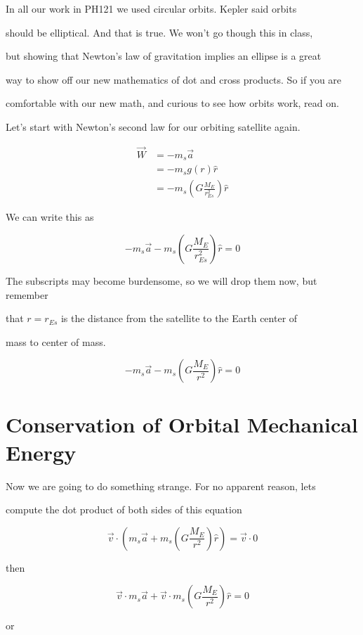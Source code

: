 In all our work in PH121 we used circular orbits. Kepler said orbits

should be elliptical. And that is true. We won't go though this in class,

but showing that Newton's law of gravitation implies an ellipse is a great

way to show off our new mathematics of dot and cross products. So if you are

comfortable with our new math, and curious to see how orbits work, read on.


Let's start with Newton's second law for our orbiting satellite again.

\begin{align*}
\overrightarrow{W}&=-m_{s}\overrightarrow{a}\\
&=-m_{s}g\left( r\right) \hat{r}\\
&=-m_{s}\left( G\frac{M_{E}}{r_{Es}^{2}}\right) \hat{r}
\end{align*}




We can write this as 

$$
-m_{s}\overrightarrow{a}-m_{s}\left( G\frac{M_{E}}{r_{Es}^{2}}\right) \hat{r}=0
$$


The subscripts may become burdensome, so we will drop them now, but remember

that $r=r_{Es}$ is the distance from the satellite to the Earth center of

mass to center of mass. 

$$-m_{s}\overrightarrow{a}-m_{s}\left( G\frac{M_{E}}{r^{2}}\right) \hat{r}=0$$


\section{Conservation of Orbital Mechanical Energy}


Now we are going to do something strange. For no apparent reason, lets

compute the dot product of both sides of this equation 

$$\overrightarrow{v}\cdot \left( m_{s}\overrightarrow{a}+m_{s}\left( G\frac{M_{E}}{r^{2}}\right) \hat{r}\right) =\overrightarrow{v}\cdot 0 $$

then 

$$\overrightarrow{v}\cdot m_{s}\overrightarrow{a}+\overrightarrow{v}\cdot m_{s}\left( G\frac{M_{E}}{r^{2}}\right) \hat{r}=0 $$

or

